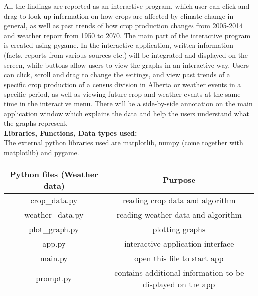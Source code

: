 \documentclass[fontsize=11pt]{article}
\begin{document}
All the findings are reported as an interactive program, which user can click and drag to look up information on how crops are affected by climate change in general, as well as past trends of how crop production changes from 2005-2014 and weather report from 1950 to 2070.
The main part of the interactive program is created using pygame. In the interactive application, written information (facts, reports from various sources etc.) will be integrated and displayed on the screen, while buttons allow users to view the graphs in an interactive way.  Users can click, scroll and drag to change the settings, and view past trends of a specific crop production of a census division in Alberta or weather events in a specific period, as well as viewing future crop and weather events at the same time in the interactive menu. There will be a side-by-side annotation on the main application window which explains the data and help the users understand what the graphs represent. \\

\textbf{Libraries, Functions, Data types used:}\\

The external python libraries used are matplotlib, numpy (come together with matplotlib) and pygame.\\

\begin{tabular}{||c|c||}
    \hline
    Python files (Weather data) & Purpose \\
    \hline\hline
    crop\_data.py & reading crop data and algorithm \\
    \hline
    weather\_data.py & reading weather data and algorithm \\
    \hline
    plot\_graph.py & plotting graphs \\
    \hline
    app.py & interactive application interface \\
    \hline
    main.py & open this file to start app \\
    \hline
    prompt.py & contains additional information to be displayed on the app \\
    \hline
\end{tabular}
\end{document}
